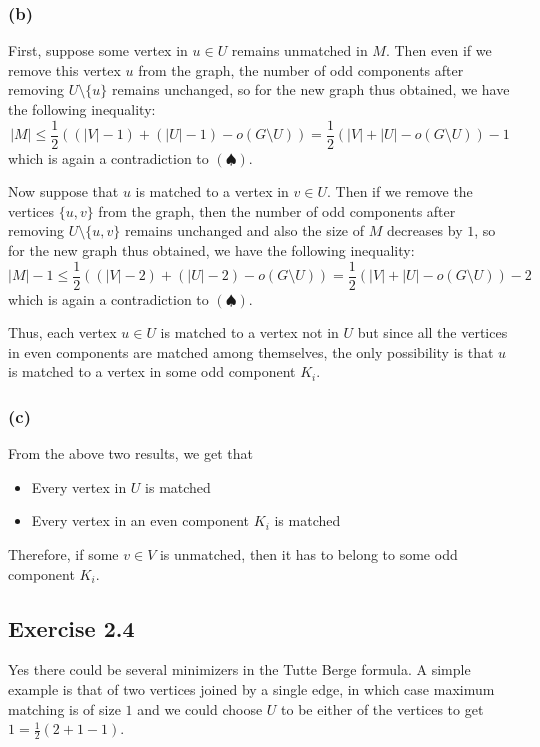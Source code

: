 \documentclass[12pt]{article}
\begin{document}
\subsubsection*{(b)}
First, suppose some vertex in $u \in U$ remains unmatched in $M$. Then even if we remove this vertex $u$ from the graph, the number of odd components after removing $U \setminus \{u\}$ remains unchanged, so for the new graph thus obtained, we have the following inequality:
$$|M| \leq \frac{1}{2}((|V|-1) + (|U|-1) - o(G \setminus U)) = \frac{1}{2}(|V| + |U| - o(G \setminus U)) - 1$$
which is again a contradiction to $(\spadesuit)$.

Now suppose that $u$ is matched to a vertex in $v \in U$. Then if we remove the vertices $\{u,v\}$ from the graph, then the number of odd components after removing $U \setminus \{u,v\}$ remains unchanged and also the size of $M$ decreases by $1$, so for the new graph thus obtained, we have the following inequality:
$$|M|-1 \leq \frac{1}{2}((|V|-2) + (|U|-2) - o(G \setminus U)) = \frac{1}{2}(|V| + |U| - o(G \setminus U)) - 2$$
which is again a contradiction to $(\spadesuit)$.

Thus, each vertex $u \in U$ is matched to a vertex not in $U$ but since all the vertices in even components are matched among themselves, the only possibility is that $u$ is matched to a vertex in some odd component $K_i$.

\subsubsection*{(c)}
From the above two results, we get that
\begin{itemize}
    \item Every vertex in $U$ is matched
    \item Every vertex in an even component $K_i$ is matched
\end{itemize}
Therefore, if some $v \in V$ is unmatched, then it has to belong to some odd component $K_i$.

\subsection*{Exercise 2.4}

Yes there could be several minimizers in the Tutte Berge formula. A simple example is that of two vertices joined by a single edge, in which case maximum matching is of size $1$ and we could choose $U$ to be either of the vertices to get $1 = \frac{1}{2}(2 + 1 - 1)$.
\end{document}
